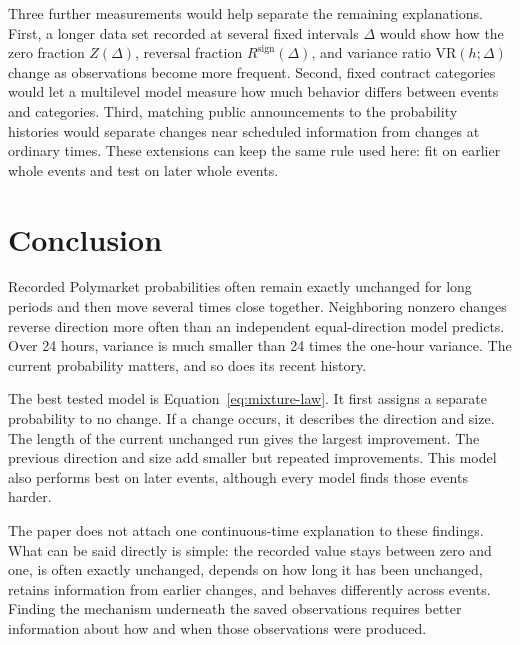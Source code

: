 \documentclass[10pt,twoside]{article}
\begin{document}
Three further measurements would help separate the remaining explanations. First, a longer data set recorded at several fixed intervals $\Delta$ would show how the zero fraction $Z(\Delta)$, reversal fraction $R^{\mathrm{sign}}(\Delta)$, and variance ratio $\mathrm{VR}(h;\Delta)$ change as observations become more frequent. Second, fixed contract categories would let a multilevel model measure how much behavior differs between events and categories. Third, matching public announcements to the probability histories would separate changes near scheduled information from changes at ordinary times. These extensions can keep the same rule used here: fit on earlier whole events and test on later whole events.

\section{Conclusion}

Recorded Polymarket probabilities often remain exactly unchanged for long periods and then move several times close together. Neighboring nonzero changes reverse direction more often than an independent equal-direction model predicts. Over 24 hours, variance is much smaller than 24 times the one-hour variance. The current probability matters, and so does its recent history.

The best tested model is Equation~\eqref{eq:mixture-law}. It first assigns a separate probability to no change. If a change occurs, it describes the direction and size. The length of the current unchanged run gives the largest improvement. The previous direction and size add smaller but repeated improvements. This model also performs best on later events, although every model finds those events harder.

The paper does not attach one continuous-time explanation to these findings. What can be said directly is simple: the recorded value stays between zero and one, is often exactly unchanged, depends on how long it has been unchanged, retains information from earlier changes, and behaves differently across events. Finding the mechanism underneath the saved observations requires better information about how and when those observations were produced.
\end{document}
